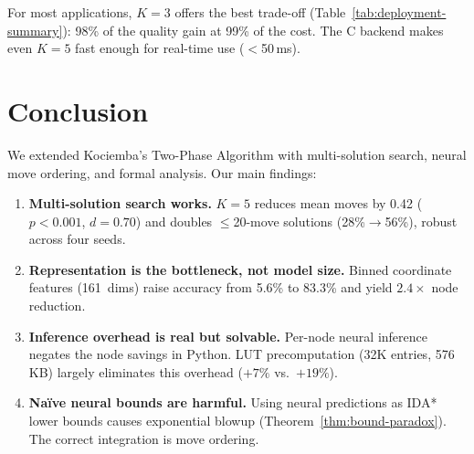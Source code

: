 \documentclass[graybox]{svmult}
\begin{document}
\begin{table}[!t]
\centering
\caption{Recommended settings for different use cases.}
\label{tab:deployment-summary}
\end{table}

For most applications, $K{=}3$ offers the best trade-off (Table~\ref{tab:deployment-summary}): 98\% of the quality gain at 99\% of the cost. The C backend makes even $K{=}5$ fast enough for real-time use ($<$50\,ms).

\section{Conclusion}
\label{sec:conclusion}

We extended Kociemba's Two-Phase Algorithm with multi-solution search, neural move ordering, and formal analysis. Our main findings:

\begin{enumerate}[leftmargin=*]
  \item \textbf{Multi-solution search works.} $K{=}5$ reduces mean moves by 0.42 ($p < 0.001$, $d = 0.70$) and doubles $\leq$20-move solutions (28\%$\to$56\%), robust across four seeds.
  \item \textbf{Representation is the bottleneck, not model size.} Binned coordinate features (161~dims) raise accuracy from 5.6\% to 83.3\% and yield $2.4\times$ node reduction.
  \item \textbf{Inference overhead is real but solvable.} Per-node neural inference negates the node savings in Python. LUT precomputation (32K entries, 576\,KB) largely eliminates this overhead ($+7\%$ vs.\ $+19\%$).
  \item \textbf{Na\"ive neural bounds are harmful.} Using neural predictions as IDA* lower bounds causes exponential blowup (Theorem~\ref{thm:bound-paradox}). The correct integration is move ordering.
\end{enumerate}
\end{document}
